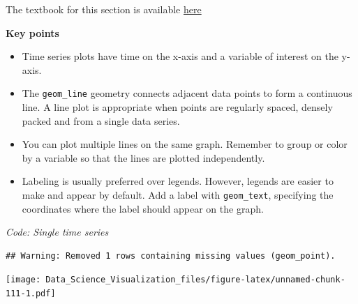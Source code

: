\documentclass[
]{article}
\newenvironment{Shaded}{\begin{snugshade}}{\end{snugshade}}
\newcommand{\CommentTok}[1]{\textcolor[rgb]{0.56,0.35,0.01}{\textit{#1}}}
\newcommand{\KeywordTok}[1]{\textcolor[rgb]{0.13,0.29,0.53}{\textbf{#1}}}
\newcommand{\NormalTok}[1]{#1}
\newcommand{\OperatorTok}[1]{\textcolor[rgb]{0.81,0.36,0.00}{\textbf{#1}}}
\newcommand{\StringTok}[1]{\textcolor[rgb]{0.31,0.60,0.02}{#1}}
\providecommand{\tightlist}{%
  \setlength{\itemsep}{0pt}\setlength{\parskip}{0pt}}
\begin{document}
The textbook for this section is available
\href{https://rafalab.github.io/dsbook/gapminder.html\#time-series-plots}{here}

\textbf{Key points}

\begin{itemize}
\tightlist
\item
  Time series plots have time on the x-axis and a variable of interest
  on the y-axis.
\item
  The \texttt{geom\_line} geometry connects adjacent data points to form
  a continuous line. A line plot is appropriate when points are
  regularly spaced, densely packed and from a single data series.
\item
  You can plot multiple lines on the same graph. Remember to group or
  color by a variable so that the lines are plotted independently.
\item
  Labeling is usually preferred over legends. However, legends are
  easier to make and appear by default. Add a label with
  \texttt{geom\_text}, specifying the coordinates where the label should
  appear on the graph.
\end{itemize}

\emph{Code: Single time series}

\begin{Shaded}
\end{Shaded}

\begin{verbatim}
## Warning: Removed 1 rows containing missing values (geom_point).
\end{verbatim}

\texttt{[image: Data\_Science\_Visualization\_files/figure-latex/unnamed-chunk-111-1.pdf]}

\begin{Shaded}
\end{Shaded}
\end{document}
